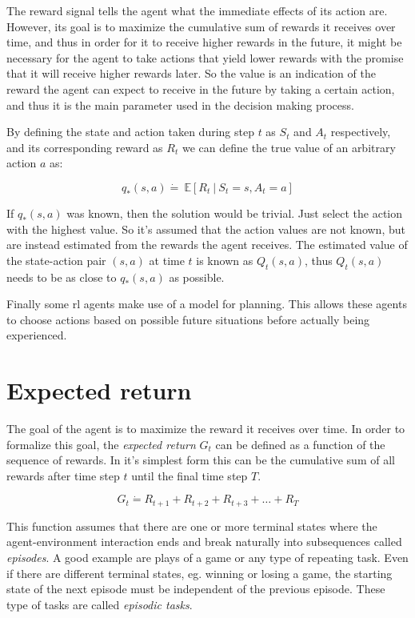 The reward signal tells the agent what the immediate effects of its action are. However, its goal is to maximize the cumulative sum of rewards it receives over time, and thus in order for it to receive higher rewards in the future, it might be necessary for the agent to take actions that yield lower rewards with the promise that it will receive higher rewards later. So the value is an indication of the reward the agent can expect to receive in the future by taking a certain action, and thus it is the main parameter used in the decision making process. 

By defining the state and action taken during step $t$ as $S_t$ and $A_t$ respectively, and its corresponding reward as $R_t$ we can define the true value of an arbitrary action $a$ as:

\begin{equation}
  q_*\left (s, a \right )\dot{=}\ \mathbb{E}\left[R_t\ |\ S_t=s, A_t=a \right ]
\end{equation}

If $q_*(s, a)$ was known, then the solution would be trivial. Just select the action with the highest value. So it's assumed that the action values are not known, but are instead estimated from the rewards the agent receives. The estimated value of the state-action pair $(s, a)$ at time $t$ is known as $Q_t(s, a)$, thus $Q_t(s, a)$ needs to be as close to $q_*(s, a)$ as possible.

Finally some \gls{rl} agents make use of a model for planning. This allows these agents to choose actions based on possible future situations before actually being experienced.


\section{Expected return}
The goal of the agent is to maximize the reward it receives over time. In order to formalize this goal, the \emph{expected return} $G_t$ can be defined as a function of the sequence of rewards. In it's simplest form this can be the cumulative sum of all rewards after time step $t$ until the final time step $T$.

\begin{equation}
  G_t \dot{=} R_{t+1} + R_{t+2} + R_{t+3} + \ldots + R_{T}
  \label{eq:exp_r_1}
\end{equation}

This function assumes that there are one or more terminal states where the agent-environment interaction ends and break naturally into subsequences called \emph{episodes}. A good example are plays of a game or any type of repeating task. Even if there are different terminal states, eg. winning or losing a game, the starting state of the next episode must be independent of the previous episode. These type of tasks are called \emph{episodic tasks}. 

